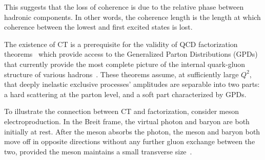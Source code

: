 This suggests that the loss of coherence is due to the relative phase between
hadronic components.
In other words, the coherence length is the length at which coherence between
the lowest and first excited states is lost.




The existence of CT is a prerequisite for the validity of QCD factorization
theorems~\cite{Brodsky_1994, Collins_1997, Frankfurt_1999, Diehl_1998,
Strikman_2000} which provide access to the Generalized Parton Distributions
(GPDs) that currently provide the most complete picture of the internal
quark-gluon structure of various hadrons~\cite{Ji_1997_Jan, Ji_1997_Jun,
Radyushkin_1996, Radyushkin_1997}.
These theorems assume, at sufficiently large $Q^2$, that deeply inelastic
exclusive processes' amplitudes are separable into two parts: a hard scattering
at the parton level, and a soft part characterized by GPDs.

To illustrate the connection between CT and factorization, consider
meson electroproduction.
In the Breit frame, the virtual photon and baryon are both initially at rest.
After the meson absorbs the photon, the meson and baryon both move off in
opposite directions without any further gluon exchange between the two,
provided the meson maintains a small transverse size~\cite{Strikman_2000}.


